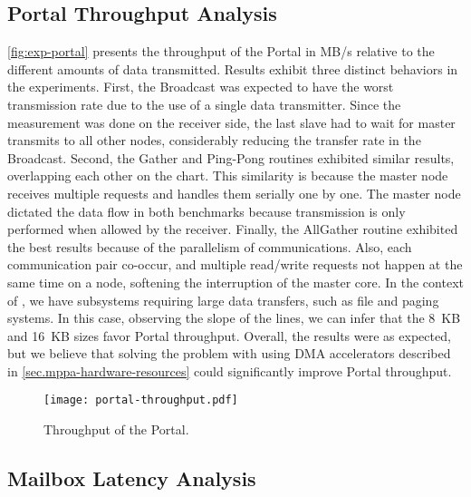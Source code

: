 		\subsection{Portal Throughput Analysis}

			\autoref{fig:exp-portal} presents the throughput of the Portal in MB/s
			relative to the different amounts of data transmitted. Results exhibit
			three distinct behaviors in the experiments. First, the Broadcast was
			expected to have the worst transmission rate due to the use of a single
			data transmitter. Since the measurement was done on the receiver side,
			the last slave had to wait for master transmits to all other nodes,
			considerably reducing the transfer rate in the Broadcast. Second, the
			Gather and Ping-Pong routines exhibited similar results, overlapping
			each other on the chart. This similarity is because the master node
			receives multiple requests and handles them serially one by one.
			The master node dictated the data flow in both benchmarks because
			transmission is only performed when allowed by the receiver. Finally,
			the AllGather routine exhibited the best results because of the
			parallelism of communications. Also, each communication pair co-occur,
			and multiple read/write requests not happen at the same time on a node,
			softening the interruption of the master core. In the context of \oss,
			we have subsystems requiring large data transfers, such as file and
			paging systems. In this case, observing the slope of the lines,
			we can infer that the 8~KB and 16~KB sizes favor Portal throughput.
			Overall, the results were as expected, but we believe that solving
			the problem with using DMA accelerators described in
			\autoref{sec.mppa-hardware-resources} could significantly improve
			Portal throughput.

			\begin{figure}[!tb]
				\centering%
				\caption{Throughput of the Portal.}%
				\label{fig:exp-portal}%
				\texttt{[image: portal-throughput.pdf]}%
			\end{figure}

		\subsection{Mailbox Latency Analysis}

